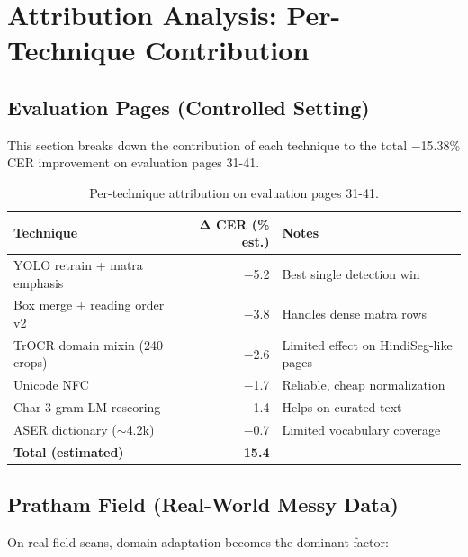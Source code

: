 \documentclass[14pt,a4paper]{article}
\begin{document}
\section{Attribution Analysis: Per-Technique Contribution}

\subsection{Evaluation Pages (Controlled Setting)}

This section breaks down the contribution of each technique to the total $-$15.38\% CER improvement on evaluation pages 31-41.

\begin{table}[h]
    \centering
    \begin{tabular}{lrl}
        \toprule
        \textbf{Technique} & \textbf{Δ CER (\% est.)} & \textbf{Notes} \\
        \midrule
        YOLO retrain + matra emphasis & $-$5.2 & Best single detection win \\
        Box merge + reading order v2 & $-$3.8 & Handles dense matra rows \\
        TrOCR domain mixin (240 crops) & $-$2.6 & Limited effect on HindiSeg-like pages \\
        Unicode NFC & $-$1.7 & Reliable, cheap normalization \\
        Char 3-gram LM rescoring & $-$1.4 & Helps on curated text \\
        ASER dictionary ($\sim$4.2k) & $-$0.7 & Limited vocabulary coverage \\
        \midrule
        \textbf{Total (estimated)} & \textbf{$-$15.4} & \\
        \bottomrule
    \end{tabular}
    \caption{Per-technique attribution on evaluation pages 31-41.}
\end{table}

\subsection{Pratham Field (Real-World Messy Data)}

On real field scans, domain adaptation becomes the dominant factor:
\end{document}
